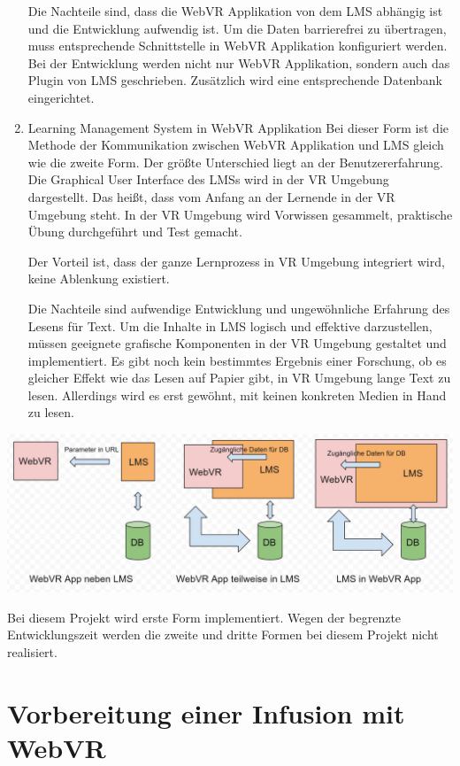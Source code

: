 \begin{enumerate}
     Die Nachteile sind, dass die WebVR Applikation von dem LMS abhängig ist und die Entwicklung aufwendig ist. Um die Daten barrierefrei zu übertragen, muss entsprechende Schnittstelle in WebVR Applikation konfiguriert werden. Bei der Entwicklung werden nicht nur WebVR Applikation, sondern auch das Plugin von LMS geschrieben. Zusätzlich wird eine entsprechende Datenbank eingerichtet.
     
   \item Learning Management System in WebVR Applikation
     \subitem Bei dieser Form ist die Methode der Kommunikation zwischen WebVR Applikation und LMS gleich wie die zweite Form. Der größte Unterschied liegt an der Benutzererfahrung. Die Graphical User Interface des LMSs wird in der VR Umgebung dargestellt. Das heißt, dass vom Anfang an der Lernende in der VR Umgebung steht. In der VR Umgebung wird Vorwissen gesammelt, praktische Übung durchgeführt und Test gemacht.
     
     Der Vorteil ist, dass der ganze Lernprozess in VR Umgebung integriert wird, keine Ablenkung existiert.
     
     Die Nachteile sind aufwendige Entwicklung und ungewöhnliche Erfahrung des Lesens für Text. Um die Inhalte in LMS logisch und effektive darzustellen, müssen geeignete grafische Komponenten in der VR Umgebung gestaltet und implementiert. Es gibt noch kein bestimmtes Ergebnis einer Forschung, ob es gleicher Effekt wie das Lesen auf Papier gibt, in VR Umgebung lange Text zu lesen. Allerdings wird es erst gewöhnt, mit keinen konkreten Medien in Hand zu lesen.
 \end{enumerate}
\includegraphics[width=\textwidth]{images/formenDerVerbindung.jpg}

Bei diesem Projekt wird erste Form implementiert. Wegen der begrenzte Entwicklungszeit werden die zweite und dritte Formen bei diesem Projekt nicht realisiert.

\section{Vorbereitung einer Infusion mit WebVR}

